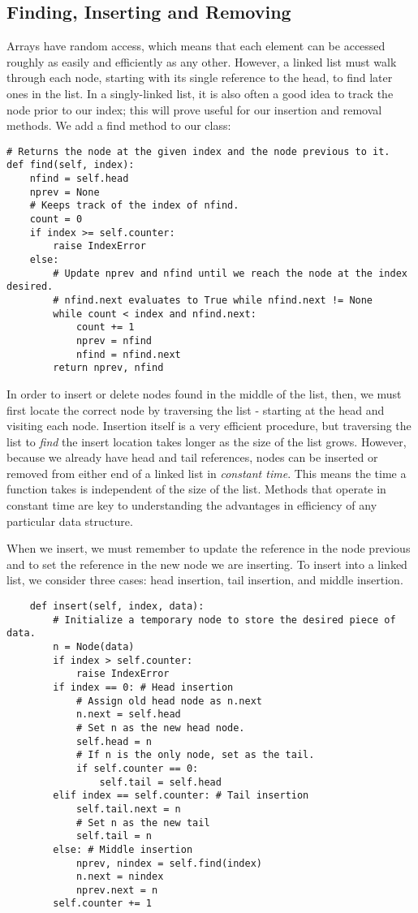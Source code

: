 \subsection*{Finding, Inserting and Removing}
Arrays have random access, which means that each element can be accessed roughly as easily and efficiently as any other. However, a linked list must walk through each node, starting with its single reference to the head, to find later ones in the list.
In a singly-linked list, it is also often a good idea to track the node prior to our index; this will prove useful for our insertion and removal methods. 
We add a find method to our  class:
\begin{lstlisting}
# Returns the node at the given index and the node previous to it.
def find(self, index):
    nfind = self.head
    nprev = None
    # Keeps track of the index of nfind.
    count = 0
    if index >= self.counter:
        raise IndexError
    else:
        # Update nprev and nfind until we reach the node at the index desired.
        # nfind.next evaluates to True while nfind.next != None
        while count < index and nfind.next:
            count += 1
            nprev = nfind
            nfind = nfind.next
        return nprev, nfind
\end{lstlisting}

In order to insert or delete nodes found in the middle of the list, then, we must first locate the correct node by traversing the list - starting at the head and visiting each node.
Insertion itself is a very efficient procedure, but traversing the list to \emph{find} the insert location takes longer as the size of the list grows. 
However, because we already have head and tail references, nodes can be inserted or removed from either end of a linked list in \emph{constant time}.
This means the time a function takes is independent of the size of the list.
Methods that operate in constant time are key to understanding the advantages in efficiency of any particular data structure.

When we insert, we must remember to update the  reference in the node previous and to set the  reference in the new node we are inserting.
To insert into a linked list, we consider three cases: head insertion, tail insertion, and middle insertion. 

\begin{lstlisting}
    def insert(self, index, data):
        # Initialize a temporary node to store the desired piece of data.
        n = Node(data)        
        if index > self.counter:
            raise IndexError
        if index == 0: # Head insertion
            # Assign old head node as n.next
            n.next = self.head
            # Set n as the new head node.
            self.head = n
            # If n is the only node, set as the tail.
            if self.counter == 0:
                self.tail = self.head
        elif index == self.counter: # Tail insertion
            self.tail.next = n
            # Set n as the new tail
            self.tail = n
        else: # Middle insertion
            nprev, nindex = self.find(index)
            n.next = nindex
            nprev.next = n
        self.counter += 1
\end{lstlisting}


